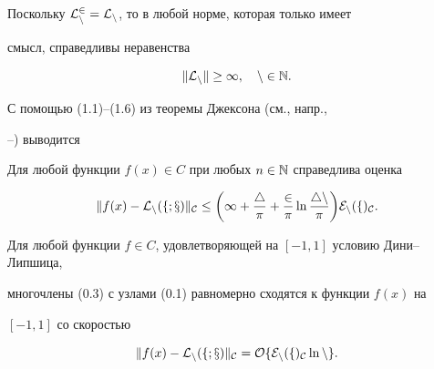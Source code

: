 Поскольку $\cal{L}_n^2=\cal{L}_n$, то в любой норме, которая только имеет 


смысл, справедливы неравенства


\begin{equation}


\|\cal{L}_n\|\ge 1,\quad n \in \N.


\end{equation}





С помощью (1.1)--(1.6) из теоремы Джексона (см., напр.,


\cite{7}--\cite{15}) выводится








\begin{thm}


Для любой функции $f(x)\in C$ при любых $n\in \Bbb{N}$ справедлива оценка


\begin{equation}


\|f(x)-\cal{L}_n(f;x)\|_C \le


\bigg(1+\frac{4}{\pi}+\frac{2}{\pi}\ln\frac{4n}{\pi}\bigg)E_n(f)_C.


\end{equation}


\end{thm}








\begin{cor}


Для любой функции $f\in C$, удовлетворяющей на $[-1,1]$ условию Дини--Липшица,


многочлены (0.3) с узлами (0.1) равномерно сходятся к функции $f(x)$ на


$[-1,1]$ со скоростью


\begin{equation}


\|f(x) - \cal{L}_n(f;x)\|_C=O\{E_n(f)_C \ln n\}.


\end{equation}


\end{cor}








